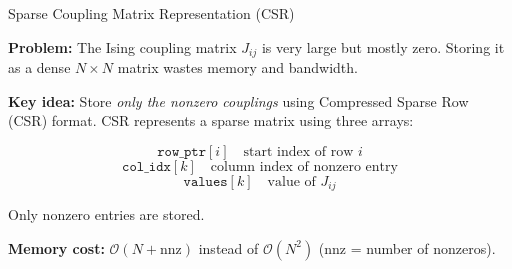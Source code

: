 \documentclass[9pt]{beamer}
\begin{document}
\begin{frame}{Sparse Coupling Matrix Representation (CSR)}

\textbf{Problem:}
The Ising coupling matrix $J_{ij}$ is very large but mostly zero.
Storing it as a dense $N \times N$ matrix wastes memory and bandwidth.

\vspace{0.3cm}
\textbf{Key idea:}
Store \emph{only the nonzero couplings} using
\alert{Compressed Sparse Row (CSR)} format. CSR represents a sparse matrix using three arrays:

\[
\texttt{row\_ptr}[i] \quad \text{start index of row } i
\]
\[
\texttt{col\_idx}[k] \quad \text{column index of nonzero entry}
\]
\[
\texttt{values}[k] \quad \text{value of } J_{ij}
\]

Only nonzero entries are stored.

\vspace{0.2cm}
\textbf{Memory cost:} $\mathcal{O}(N + \text{nnz})$ instead of $\mathcal{O}(N^2)$ (nnz = number of nonzeros).

\end{frame}
\end{document}
